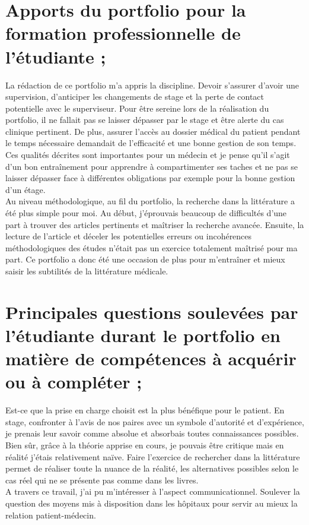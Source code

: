 \section{Apports du portfolio pour la formation professionnelle de l'étudiante ;}
La rédaction de ce portfolio m'a appris la discipline. Devoir s'assurer d'avoir une supervision, d'anticiper les changements de stage et la perte de contact potentielle avec le superviseur. Pour être sereine lors de la réalisation du portfolio, il ne fallait pas se laisser dépasser par le stage et être alerte du cas clinique pertinent. De plus, assurer l'accès au dossier médical du patient pendant le temps nécessaire demandait de l'efficacité et une bonne gestion de son temps. Ces qualités décrites sont importantes pour un médecin et je pense qu'il s'agit d'un bon entraînement pour apprendre à compartimenter ses taches et ne pas se laisser dépasser face à différentes obligations par exemple pour la bonne gestion d'un étage.\\
Au niveau méthodologique, au fil du portfolio, la recherche dans la littérature a été plus simple pour moi. Au début, j'éprouvais beaucoup de difficultés d'une part à trouver des articles pertinents et maîtriser la recherche avancée. Ensuite, la lecture de l'article et déceler les potentielles erreurs ou incohérences méthodologiques des études n'était pas un exercice totalement maîtrisé pour ma part. Ce portfolio a donc été une occasion de plus pour m'entraîner et mieux saisir les subtilités de la littérature médicale.

\section{Principales questions soulevées par l’étudiante durant le portfolio en matière de compétences à acquérir ou à compléter ;}
Est-ce que la prise en charge choisit est la plus bénéfique pour le patient. En stage, confronter à l'avis de nos paires avec un symbole d'autorité et d'expérience, je prenais leur savoir comme absolue et absorbais toutes connaissances possibles. Bien sûr, grâce à la théorie apprise en cours, je pouvais être critique mais en réalité j'étais relativement naïve. Faire l'exercice de rechercher dans la littérature permet de réaliser toute la nuance de la réalité, les alternatives possibles selon le cas réel qui ne se présente pas comme dans les livres.\\
A travers ce travail, j'ai pu m'intéresser à l'aspect communicationnel. Soulever la question des moyens mis à disposition dans les hôpitaux pour servir au mieux la relation patient-médecin. 

